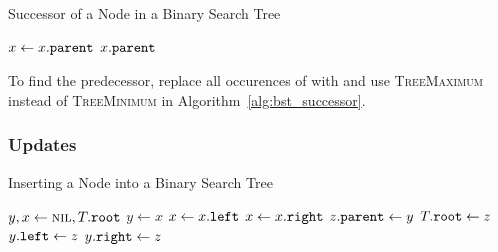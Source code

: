 \begin{algorithm}[htb]
  \caption{Successor of a Node in a Binary Search Tree}
  \label{alg:bst_successor}
  \begin{algorithmic}[1]
        \State \Return {} 
      \EndIf
        \State $x\gets x\mathtt{.}\mathtt{parent}$ 
      \EndWhile
      \State \Return $x\mathtt{.}\mathtt{parent}$ 
    \EndFunction
  \end{algorithmic}
\end{algorithm}
To find the predecessor, replace all occurences of  with  and use \textsc{TreeMaximum} instead of \textsc{TreeMinimum} in Algorithm~\ref{alg:bst_successor}.



\subsubsection{Updates}

\begin{algorithm}[htb]
  \caption{Inserting a Node into a Binary Search Tree}
  \label{alg:bst_insert}
  \begin{algorithmic}[1]
      \State $y, x \gets \textsc{nil}, T\mathtt{.}\mathtt{root}$
        \State $y\gets x$
          \State $x\gets x\mathtt{.}\mathtt{left}$
        \Else
          \State $x\gets x\mathtt{.}\mathtt{right}$
        \EndIf
      \EndWhile
      \State $z\mathtt{.}\mathtt{parent}\gets y$
        \State $T\mathtt{.}\mathtt{root}\gets z$
        \State $y\mathtt{.}\mathtt{left}\gets z$
      \Else
        \State $y\mathtt{.}\mathtt{right}\gets z$
      \EndIf
    \EndFunction
  \end{algorithmic}
\end{algorithm}


